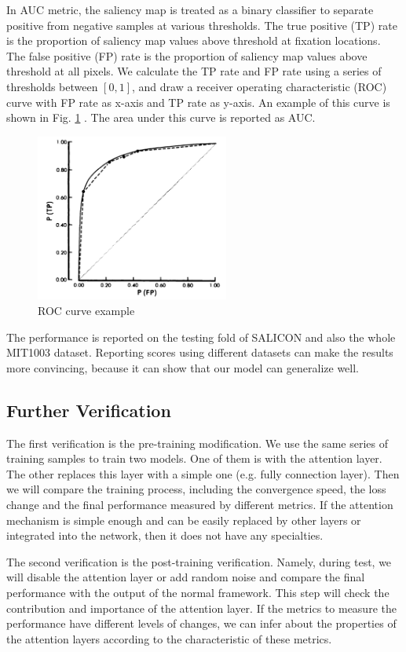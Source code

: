 \documentclass[12pt]{article}
\begin{document}
In AUC metric,
the saliency map is treated as a binary classifier to separate positive from negative samples at various thresholds.
The true positive (TP) rate is the proportion of saliency map values above threshold at fixation locations.
The false positive (FP) rate is the proportion of saliency map values above threshold at all pixels.
We calculate the TP rate and FP rate using a series of thresholds between $[0, 1]$, and draw a
receiver operating characteristic (ROC) curve with FP rate as x-axis and TP rate as y-axis.
An example of this curve is shown in Fig. \ref{img:AUC} \cite{hanleyMeaningUseArea1982}.
The area under this curve is reported as AUC.
\begin{figure}[!h]
    \centering
    \includegraphics[width=2.5in]{imgs/AUC.png}
    \caption{ROC curve example}
    \label{img:AUC}
\end{figure}


The performance is reported on the testing fold of SALICON and also the whole MIT1003 dataset.
Reporting scores using different datasets can make the results more convincing,
because it can show that our model can generalize well.
\subsection{Further Verification}

The first verification is the pre-training modification. We use the same series of training samples to train two models. One of them is with the attention layer. The other replaces this layer with a simple one (e.g. fully connection layer). Then we will compare the training process, including the convergence speed, the loss change and the final performance measured by different metrics. If the attention mechanism is simple enough and can be easily replaced by other layers or integrated into the network, then it does not have any specialties.

The second verification is the post-training verification. Namely, during test, we will disable the attention layer or add random noise and compare the final performance with the output of the normal framework. This step will check the contribution and importance of the attention layer. If the metrics to measure the performance have different levels of changes, we can infer about the properties of the attention layers according to the characteristic of these metrics.
\end{document}
